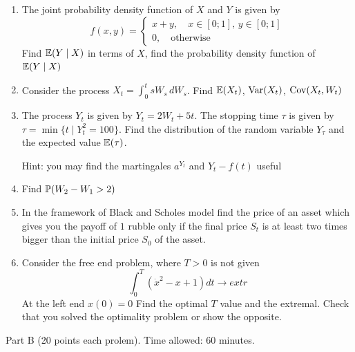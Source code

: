 \documentclass[12pt, a4paper]{article}
\begin{document}
\begin{enumerate}
\item The joint probability density function of $X$ and $Y$ is given by
\[
f(x,y)=\begin{cases}
x+y, \quad x\in[0;1],\, y\in [0;1] \\
0, \quad \text{otherwise}
\end{cases} 
\]
Find $\E(Y \mid X)$ in terms of $X$, find the probability density function of  $\E(Y \mid X)$
\item Consider the process $X_t=\int_0^t sW_s\,dW_s$. Find $\E(X_t)$, $\Var(X_t)$, $\Cov(X_t,W_t)$
\item The process $Y_t$ is given by $Y_t=2W_t+5t$. The stopping time $\tau$ is given by $\tau=\min\{t \mid Y_t^2=100\}$. Find the distribution of the random variable $Y_\tau$ and the expected value $\E(\tau)$.


Hint: you may find the martingales $a^{Y_t}$ and $Y_t-f(t)$ useful
\item Find $\P(W_2-W_1>2)$
\item In the framework of Black and Scholes model find the price of an asset which gives you the payoff of $1$ rubble only if the final price $S_t$ is at least two times bigger than the initial price $S_0$ of the asset.
\item Consider the free end problem, where $T>0$ is not given
\[
\int_0^T (\dot{x}^2-x+1)dt \to extr 
\]
At the left end $x(0)=0$
Find the optimal $T$ value and the extremal. Check that you solved the optimality problem or show the opposite.
\end{enumerate}

Part B (20 points each prolem). Time allowed: 60 minutes.
\end{document}
